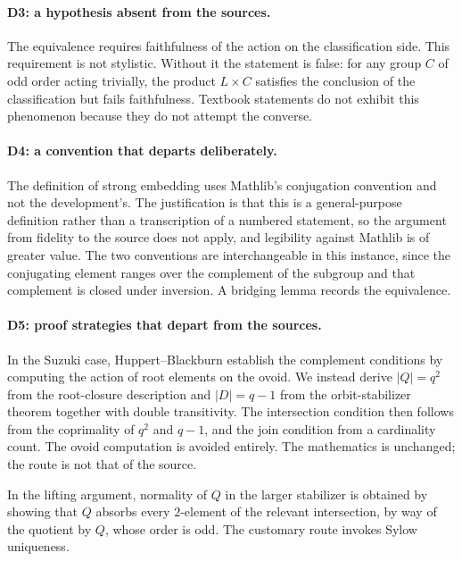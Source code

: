 \documentclass{article}
\begin{document}
\paragraph{D3: a hypothesis absent from the sources.}
The equivalence requires faithfulness of the action on the classification side.
This requirement is not stylistic. Without it the statement is false: for any
group \(C\) of odd order acting trivially, the product \(L\times C\) satisfies
the conclusion of the classification but fails faithfulness. Textbook statements
do not exhibit this phenomenon because they do not attempt the converse.

\paragraph{D4: a convention that departs deliberately.}
The definition of strong embedding uses Mathlib's conjugation convention and not
the development's. The justification is that this is a general-purpose
definition rather than a transcription of a numbered statement, so the argument
from fidelity to the source does not apply, and legibility against Mathlib is of
greater value. The two conventions are interchangeable in this instance, since
the conjugating element ranges over the complement of the subgroup and that
complement is closed under inversion. A bridging lemma records the equivalence.

\paragraph{D5: proof strategies that depart from the sources.}
In the Suzuki case, Huppert--Blackburn establish the complement conditions by
computing the action of root elements on the ovoid. We instead derive
\(\lvert Q\rvert=q^2\) from the root-closure description and
\(\lvert D\rvert=q-1\) from the orbit-stabilizer theorem together with double
transitivity. The intersection condition then follows from the coprimality of
\(q^2\) and \(q-1\), and the join condition from a cardinality count. The ovoid
computation is avoided entirely. The mathematics is unchanged; the route is not
that of the source.

In the lifting argument, normality of \(Q\) in the larger stabilizer is obtained
by showing that \(Q\) absorbs every \(2\)-element of the relevant intersection,
by way of the quotient by \(Q\), whose order is odd. The customary route invokes
Sylow uniqueness.
\end{document}
